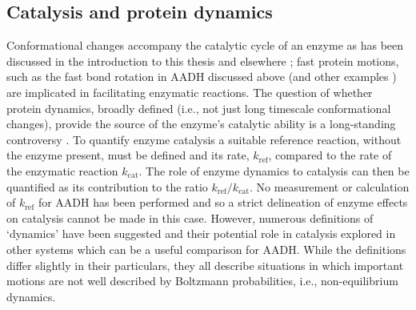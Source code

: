 \subsection{Catalysis and protein dynamics}

Conformational changes accompany the catalytic cycle of an enzyme as has been discussed in the introduction to this thesis and elsewhere \cite[chapter 10]{fershtStructureMechanismProtein1999}\cite{mcgeaghProteinDynamicsEnzyme2011, karplusMolecularDynamicsProtein2005}; fast protein motions, such as the fast bond rotation in AADH discussed above (and other examples \cite{hayGoodVibrationsEnzymecatalysed2012, klinmanHydrogenTunnelingLinks2013}) are implicated in facilitating enzymatic reactions.  The question of whether protein dynamics, broadly defined (i.e., not just long timescale conformational changes), provide the source of the enzyme's catalytic ability is a long-standing controversy \cite{kamerlinDawn21stCentury2010a, doshiDilemmaConformationalDynamics2014, kohenRoleDynamicsEnzyme2015,warshelPerspectiveDefiningQuantifying2016, mcgeaghProteinDynamicsEnzyme2011}. To quantify enzyme catalysis a suitable reference reaction, without the enzyme present, must be defined and its rate, $k_{\mathrm{ref}}$, compared to the rate of the enzymatic reaction $k_{\mathrm{cat}}$. The role of enzyme dynamics to catalysis can then be quantified as its contribution to the ratio $k_{\mathrm{ref}}/k_{\mathrm{cat}}$.  No measurement or calculation of $k_{\mathrm{ref}}$ for AADH has been performed and so a strict delineation of enzyme effects on catalysis cannot be made in this case. However, numerous definitions of `dynamics' have been suggested and their potential role in catalysis explored \cite{warshelPerspectiveDefiningQuantifying2016} in other systems which can be a useful comparison for AADH. While the definitions differ slightly in their particulars, they all describe situations in which important motions are not well described by Boltzmann probabilities, i.e., non-equilibrium dynamics. 

